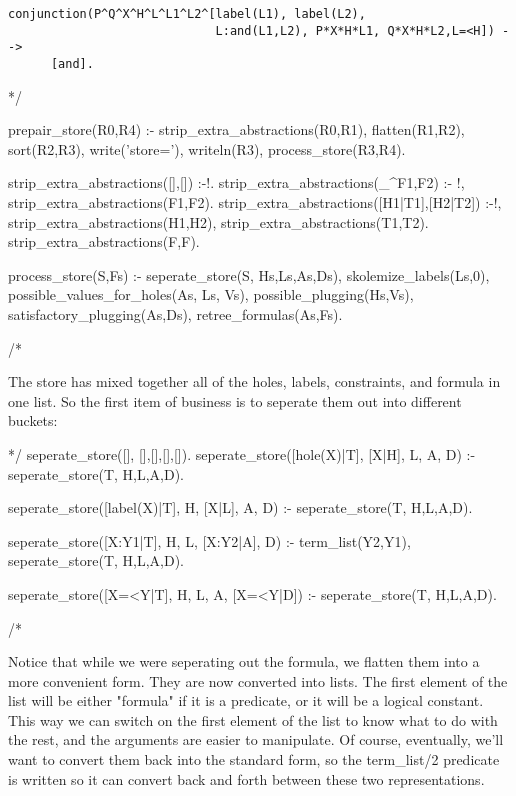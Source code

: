 \documentclass{book}[9pt]
\newenvironment{code}%
{\small \verbatim}%
{\endverbatim \large}
\begin{document}
\begin{verbatim} 
conjunction(P^Q^X^H^L^L1^L2^[label(L1), label(L2), 
                             L:and(L1,L2), P*X*H*L1, Q*X*H*L2,L=<H]) -->
      [and].  
\end{verbatim}


\begin{code}
*/

prepair_store(R0,R4) :-
        strip_extra_abstractions(R0,R1),
        flatten(R1,R2),
        sort(R2,R3),
        write('store='), writeln(R3),
        process_store(R3,R4).


strip_extra_abstractions([],[]) :-!.
strip_extra_abstractions(_^F1,F2) :- !,
        strip_extra_abstractions(F1,F2).
strip_extra_abstractions([H1|T1],[H2|T2]) :-!,
        strip_extra_abstractions(H1,H2),
        strip_extra_abstractions(T1,T2).
strip_extra_abstractions(F,F).


process_store(S,Fs) :-
        seperate_store(S, Hs,Ls,As,Ds),
        skolemize_labels(Ls,0),
        possible_values_for_holes(As, Ls, Vs),
        possible_plugging(Hs,Vs),
        satisfactory_plugging(As,Ds),
        retree_formulas(As,Fs).

/*
\end{code}

The store has mixed together all of the holes, labels, constraints,
and formula in one list.  So the first item of business is to seperate
them out into different buckets:

\begin{code}
*/
seperate_store([], [],[],[],[]).
seperate_store([hole(X)|T], [X|H], L, A, D) :-
        seperate_store(T, H,L,A,D).

seperate_store([label(X)|T], H, [X|L], A, D) :-
        seperate_store(T, H,L,A,D).

seperate_store([X:Y1|T], H, L, [X:Y2|A], D) :-
        term_list(Y2,Y1),
        seperate_store(T, H,L,A,D).

seperate_store([X=<Y|T], H, L, A, [X=<Y|D]) :-
        seperate_store(T, H,L,A,D).

/*
\end{code}

Notice that while we were seperating out the formula, we flatten them
into a more convenient form.  They are now converted into lists.  The
first element of the list will be either "formula" if it is a
predicate, or it will be a logical constant.  This way we can switch
on the first element of the list to know what to do with the rest, and
the arguments are easier to manipulate.  Of course, eventually, we'll
want to convert them back into the standard form, so the term\_list/2
predicate is written so it can convert back and forth between these
two representations.
\end{document}
